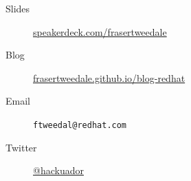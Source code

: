 \documentclass[ignorenonframetext,aspectratio=169,12pt]{beamer}
\begin{document}
\begin{frame}[plain]
\begin{columns}
\begin{column}{.6\textwidth}
    \begin{description}
      \item[Slides] \href{https://speakerdeck.com/frasertweedale}{speakerdeck.com/frasertweedale}
      \item[Blog] \href{https://frasertweedale.github.io/blog-redhat/}{frasertweedale.github.io/blog-redhat}
      \item[Email] \texttt{ftweedal@redhat.com}
      \item[Twitter] \href{https://twitter.com/hackuador}{@hackuador}
    \end{description}
  \end{column}

\end{columns}
\end{frame}
\end{document}
